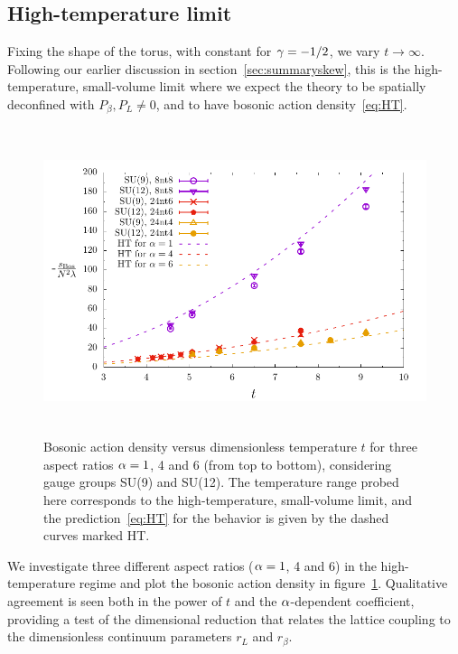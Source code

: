 \subsection{High-temperature limit}
Fixing the shape of the torus, with constant \al for $\gamma = -1 / 2$, we vary $t \to \infty$.
Following our earlier discussion in section~\ref{sec:summaryskew}, this is the high-temperature, small-volume limit where we expect the theory to be spatially deconfined with $P_{\beta}, P_L \ne 0$, and to have bosonic action density~\eqref{eq:HT}.

\begin{figure}[tbp]
  \centering
  \includegraphics[height=9cm]{Figures/highT.pdf}
  \caption{\label{fig:highT}Bosonic action density versus dimensionless temperature $t$ for three aspect ratios $\alpha = 1$, 4 and 6 (from top to bottom), considering gauge groups SU(9) and SU(12).  The temperature range probed here corresponds to the high-temperature, small-volume limit, and the prediction~\protect\eqref{eq:HT} for the behavior is given by the dashed curves marked HT.}
\end{figure}

We investigate three different aspect ratios ($\alpha = 1$, 4 and 6) in the high-temperature regime and plot the bosonic action density in figure~\ref{fig:highT}.
Qualitative agreement is seen both in the power of $t$ and the $\alpha$-dependent coefficient, providing a test of the dimensional reduction that relates the lattice coupling \lalat to the dimensionless continuum parameters $r_L$ and $r_{\beta}$.

